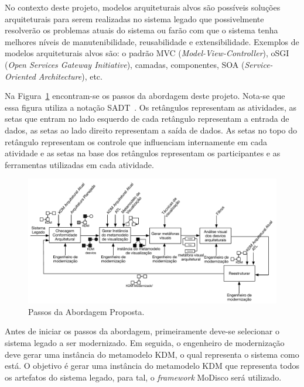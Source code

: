 \documentclass[12pt]{article}
\begin{document}
No contexto deste projeto, modelos arquiteturais alvos são possíveis soluções arquiteturais para serem realizadas no sistema legado que possivelmente resolverão os problemas atuais do sistema ou farão com que o sistema tenha melhores níveis de manutenibilidade, reusabilidade e extensibilidade. Exemplos de modelos arquiteturais alvos são: o padrão MVC (\textit{Model-View-Controller}), oSGI (\textit{Open Services Gateway Initiative}), camadas, componentes, SOA (\textit{Service-Oriented Architecture}), etc.

Na Figura~\ref{fig:approach_steps} encontram-se os passos da abordagem deste projeto. Nota-se que essa figura utiliza a notação SADT~\cite{Marcaraf}. Os retângulos representam as atividades, as setas que entram no lado esquerdo de cada retângulo representam a entrada de dados, as setas ao lado direito representam a saída de dados. As setas no topo do retângulo representam os controle que influenciam internamente em cada atividade e as setas na base dos retângulos representam os participantes e as ferramentas utilizadas em cada atividade.

\begin{figure}[htb]
 \label{fig:approach_steps}
 \centering
 \includegraphics[scale=0.66]{projeto_pos_doc_figura2.pdf}
 \caption{Passos da Abordagem Proposta.}
\end{figure}

Antes de iniciar os passos da abordagem, primeiramente deve-se selecionar o sistema legado a ser modernizado. Em seguida, o engenheiro de modernização deve gerar uma instância do metamodelo KDM, o qual representa o sistema como está. O objetivo é gerar uma instância do metamodelo KDM que representa todos os artefatos do sistema legado, para tal, o \textit{framework} MoDisco será utilizado.
\end{document}
